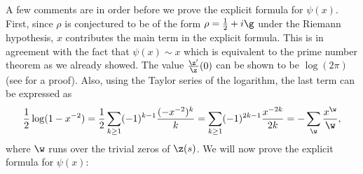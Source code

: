       A few comments are in order before we prove the explicit formula for $\psi(x)$. First, since $\rho$ is conjectured to be of the form $\rho = \frac{1}{2}+i\g$ under the Riemann hypothesis, $x$ contributes the main term in the explicit formula. This is in agreement with the fact that $\psi(x) \sim x$ which is equivalent to the prime number theorem as we already showed. The value $\frac{\z'}{\z}(0)$ can be shown to be $\log(2\pi)$ (see \cite{davenport1980multiplicative} for a proof). Also, using the Taylor series of the logarithm, the last term can be expressed as
      \[
        \frac{1}{2}\log(1-x^{-2}) = \frac{1}{2}\sum_{k \ge 1}(-1)^{k-1}\frac{(-x^{-2})^{k}}{k} = \sum_{k \ge 1}(-1)^{2k-1}\frac{x^{-2k}}{2k} = -\sum_{\w}\frac{x^{\w}}{\w},
      \]
      where $\w$ runs over the trivial zeros of $\z(s)$. We will now prove the explicit formula for $\psi(x)$:


